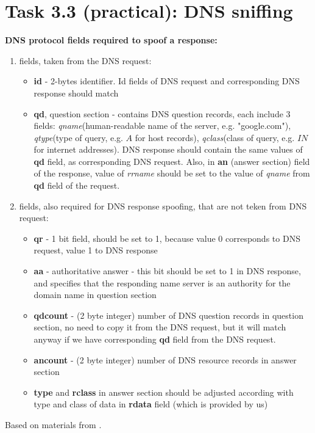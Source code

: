 \documentclass{article}
\begin{document}
\section*{Task 3.3 (practical): DNS sniffing}
\textbf{DNS protocol fields required to spoof a response:}
\begin{enumerate}
\item fields, taken from the DNS request:
\begin{itemize}
\item \textbf{id} - 2-bytes identifier. Id fields of DNS request and corresponding DNS response should match
\item \textbf{qd}, question section - contains DNS question records, each include 3 fields: \textit{qname}(human-readable name of the server, e.g. "google.com"), \textit{qtype}(type of query, e.g. $A$ for host records), \textit{qclass}(class of query, e.g. $IN$ for internet addresses). DNS response should contain the same values of \textbf{qd} field, as corresponding DNS request. Also, in \textbf{an} (answer section) field of the response, value of \textit{rrname} should be set to the value of \textit{qname} from \textbf{qd} field of the request.
\end{itemize}
\item fields, also required for DNS response spoofing, that are not teken from DNS request:
\begin{itemize}
\item \textbf{qr} - 1 bit field, should be set to 1, because value 0 corresponds to DNS request, value 1 to DNS response
\item \textbf{aa} - authoritative answer - this bit should be set to 1 in DNS response, and specifies that the responding name server is an authority for the domain name in question section
\item \textbf{qdcount} - (2 byte integer) number of DNS question records in question section, no need to copy it from the DNS request, but it will match anyway if we have corresponding  \textbf{qd} field from the DNS request.
\item \textbf{ancount} - (2 byte integer) number of DNS resource records in answer section
\item \textbf{type} and \textbf{rclass} in answer section should be adjusted according with type and class of data in \textbf{rdata} field (which is provided by us)
\end{itemize}
\end{enumerate}
Based on materials from \cite{dnsframe}.
\end{document}
